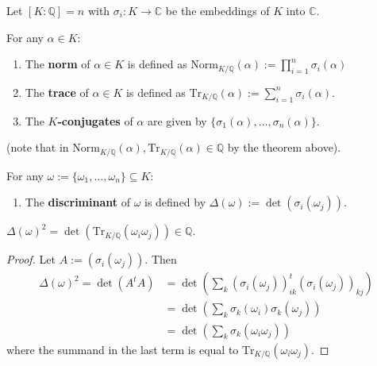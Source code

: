 \begin{definition} Let $[K : \mathbb{Q}] = n$ with $\sigma_i: K \to \mathbb{C}$ be the embeddings of $K$ into $\mathbb{C}$. 

\medskip
For any $\alpha \in K$:
\begin{enumerate}
    \item[(a)] The {\bf norm} of $\alpha \in K$ is defined as \(
\text{Norm}_{K/\mathbb{Q}}(\alpha) := \prod_{i=1}^n \sigma_i(\alpha)
\) 
\item[(b)] The {\bf trace} of $\alpha \in K$ is defined as
\(
\text{Tr}_{K/\mathbb{Q}}(\alpha) := \sum_{i=1}^n \sigma_i(\alpha).
\)
    \item[(c)] The {\bf $K$-conjugates} of $\alpha$ are given by $\{\sigma_1(\alpha), \dots, \sigma_n(\alpha)\}$.
\end{enumerate}
(note that in $\text{Norm}_{K/\mathbb{Q}}(\alpha), \text{Tr}_{K/\mathbb{Q}}(\alpha) \in \mathbb{Q}$ by the theorem above).

\medskip
For any $\omega := \{\omega_1, \dots, \omega_n\} \subseteq K$:
\begin{enumerate}
\item[(d)] The {\bf discriminant} of $\omega$ is defined by $\Delta(\omega) := \det(\sigma_i(\omega_j))$. 
\end{enumerate}
\end{definition}

\begin{lemma} $\Delta(\omega)^2 = \det(\text{Tr}_{K/\mathbb{Q}}(\omega_i\omega_j)) \in \mathbb{Q}$.
\end{lemma}

\begin{proof} Let $A := (\sigma_i(\omega_j))$. Then
\begin{align*}
\Delta(\omega)^2 = \det(A^t A) &= \det\left(\sum_k (\sigma_i(\omega_j))^t_{ik}(\sigma_i(\omega_j))_{kj}\right)
\\ &= \det\left(\sum_k \sigma_k(\omega_i)\sigma_k(\omega_j)\right)\\
&= \det\left(\sum_k \sigma_k(\omega_i\omega_j)\right)
\end{align*}
where the summand in the last term is equal to $\text{Tr}_{K/\mathbb{Q}}(\omega_i\omega_j)$.
\end{proof}

